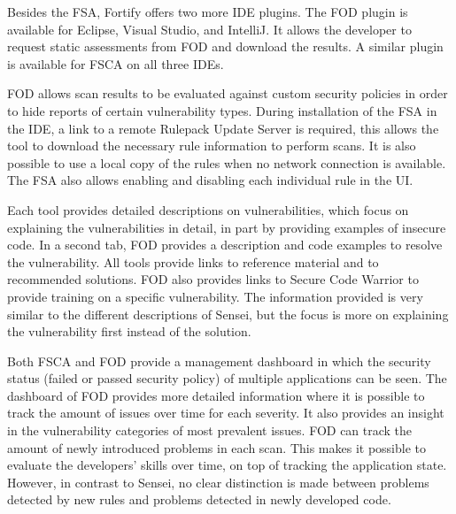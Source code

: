 
Besides the FSA, Fortify offers two more IDE plugins. The FOD plugin is available for Eclipse, Visual Studio, and IntelliJ. It allows the developer to request static assessments from FOD and download the results. A similar plugin is available for FSCA on all three IDEs. 

FOD allows scan results to be evaluated against custom security policies in order to hide reports of certain vulnerability types. During installation of the FSA in the IDE, a link to a remote Rulepack Update Server is required, this allows the tool to download the necessary rule information to perform scans. It is also possible to use a local copy of the rules when no network connection is available. The FSA also allows enabling and disabling each individual rule in the UI. 

Each tool provides detailed descriptions on vulnerabilities, which focus on explaining the vulnerabilities in detail, in part by providing examples of insecure code. In a second tab, FOD provides a description and code examples to resolve the vulnerability. All tools provide links to reference material and to recommended solutions. FOD also provides links to Secure Code Warrior to provide training on a specific vulnerability. The information provided is very similar to the different descriptions of Sensei, but the focus is more on explaining the vulnerability first instead of the solution.

Both FSCA and FOD provide a management dashboard in which the security status (failed or passed security policy) of multiple applications can be seen. The dashboard of FOD provides more detailed information where it is possible to track the amount of issues over time for each severity. It also provides an insight in the vulnerability categories of most prevalent issues. FOD can track the amount of newly introduced problems in each scan. This makes it possible to evaluate the developers' skills over time, on top of tracking the application state. However, in contrast to Sensei, no clear distinction is made between problems detected by new rules and problems detected in newly developed code.


